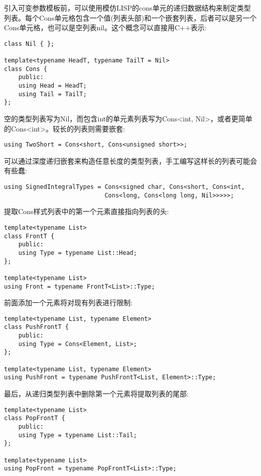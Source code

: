 引入可变参数模板前，可以使用模仿LISP的cons单元的递归数据结构来制定类型列表。每个Cons单元格包含一个值(列表头部)和一个嵌套列表，后者可以是另一个Cons单元格，也可以是空列表nil。这个概念可以直接用C++表示:

\begin{lstlisting}[style=styleCXX]
class Nil { };

template<typename HeadT, typename TailT = Nil>
class Cons {
	public:
	using Head = HeadT;
	using Tail = TailT;
};
\end{lstlisting}

空的类型列表写为Nil，而包含int的单元素列表写为Cons<int, Nil>，或者更简单的Cons<int>。较长的列表则需要嵌套:

\begin{lstlisting}[style=styleCXX]
using TwoShort = Cons<short, Cons<unsigned short>>;
\end{lstlisting}

可以通过深度递归嵌套来构造任意长度的类型列表，手工编写这样长的列表可能会有些蠢:

\begin{lstlisting}[style=styleCXX]
using SignedIntegralTypes = Cons<signed char, Cons<short, Cons<int,
							Cons<long, Cons<long long, Nil>>>>>;
\end{lstlisting}

提取Cons样式列表中的第一个元素直接指向列表的头:

\begin{lstlisting}[style=styleCXX]
template<typename List>
class FrontT {
	public:
	using Type = typename List::Head;
};

template<typename List>
using Front = typename FrontT<List>::Type;
\end{lstlisting}

前面添加一个元素将对现有列表进行限制:

\begin{lstlisting}[style=styleCXX]
template<typename List, typename Element>
class PushFrontT {
	public:
	using Type = Cons<Element, List>;
};

template<typename List, typename Element>
using PushFront = typename PushFrontT<List, Element>::Type;
\end{lstlisting}

最后，从递归类型列表中删除第一个元素将提取列表的尾部:

\begin{lstlisting}[style=styleCXX]
template<typename List>
class PopFrontT {
	public:
	using Type = typename List::Tail;
};

template<typename List>
using PopFront = typename PopFrontT<List>::Type;
\end{lstlisting}

